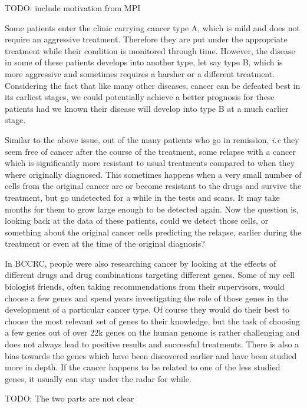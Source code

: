 TODO: include motivation from MPI

Some patients enter the clinic carrying cancer type A, which is mild and does
not require an aggressive treatment. Therefore they are put under the
appropriate treatment while their condition is monitored through time. However,
the disease in some of these patients develops into another type, let say type
B, which is more aggressive and sometimes requires a harsher or a different
treatment. Considering the fact that like many other diseases, cancer can be
defeated best in its earliest stages, we could potentially achieve a better
prognosis for these patients had we known their disease will develop into type
B at a much earlier stage.

Similar to the above issue, out of the many patients who go in remission,
\emph{i.e} they seem free of cancer after the course of the treatment, some
relapse with a cancer which is significantly more resistant to usual treatments
compared to when they where originally diagnosed. This sometimes happens when a
very small number of cells from the original cancer are or become resistant to
the drugs and survive the treatment, but go undetected for a while in the tests
and scans. It may take months for them to grow large enough to be detected
again. Now the question is, looking back at the data of these patients, could we
detect those cells, or something about the original cancer cells predicting the
relapse, earlier during the treatment or even at the time of the original
diagnosis?

In BCCRC, people were also researching cancer by looking at the effects of
different drugs and drug combinations targeting different genes. Some of my cell
biologist friends, often taking recommendations from their supervisors, would
choose a few genes and spend years investigating the role of those genes in the
development of a particular cancer type. Of course they would do their best to
choose the most relevant set of genes to their knowledge, but the task of
choosing a few genes out of over 22k genes on the human genome is rather
challenging and does not always lead to positive results and successful
treatments. There is also a bias towards the genes which have been discovered
earlier and have been studied more in depth. If the cancer happens to be related
to one of the less studied genes, it usually can stay under the radar for while.

TODO: The two parts are not clear

